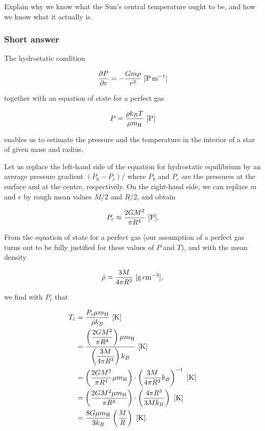 \documentclass[a4paper,10pt]{article}
\begin{document}
Explain why we know what the Sun's central temperature ought to be, and how we know what it actually is.

\subsubsection{Short answer}

The hydrostatic condition

\begin{align*}
    \frac{\partial P}{\partial r} = -\frac{Gm\rho}{r^2} ~ [{\rm P\,m^{-1}}]
\end{align*}

{\noindent}together with an equation of state for a perfect gas

\begin{align*}
    P = \frac{\rho k_BT}{\mu m_{\rm H}} ~ [{\rm P}]
\end{align*}

{\noindent}enables us to estimate the pressure and the temperature in the interior of a star of given mass and radius.

{\noindent}Let us replace the left-hand side of the equation for hydrostatic equilibrium by an average pressure gradient $(P_0-P_c)/$ where $P_0$ and $P_c$ are the pressures at the surface and at the centre, respectively. On the right-hand side, we can replace $m$ and $r$ by rough mean values $M/2$ and $R/2$, and obtain

\begin{align*}
    P_c \approx \frac{2GM^2}{\pi R^4} ~ [{\rm P}].
\end{align*}

{\noindent}From the equation of state for a perfect gas (our assumption of a perfect gas turns out to be fully justified for these values of $P$ and $T$), and with the mean density

\begin{align*}
    \bar{\rho} = \frac{3M}{4\pi R^3} ~ [{\rm g\,cm^{-3}}],
\end{align*}

{\noindent}we find with $P_c$ that

\begin{align*}
    T_c &= \frac{P_c\mu m_{\rm H}}{\bar{\rho} k_B} ~ [{\rm K}] \\
    &= \frac{\left(\dfrac{2GM^2}{\pi R^4}\right)\mu m_{\rm H}}{\left(\dfrac{3M}{4\pi R^3}\right) k_B} ~ [{\rm K}] \\
    &= \left(\frac{2GM^2}{\pi R^4}\mu m_{\rm H}\right) \cdot \left(\frac{3M}{4\pi R^3}k_B\right)^{-1} ~ [{\rm K}] \\
    &= \left(\frac{2GM^2\mu m_{\rm H}}{\pi R^4}\right) \cdot \left(\frac{4\pi R^3}{3Mk_B}\right) ~ [{\rm K}] \\
    &= \frac{8G\mu m_{\rm H}}{3k_B}\left(\frac{M}{R}\right) ~ [{\rm K}].
\end{align*}
\end{document}
